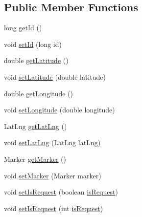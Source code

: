\subsection*{Public Member Functions}
\begin{DoxyCompactItemize}
\item 
long \hyperlink{classuk_1_1ac_1_1swan_1_1digitaltrails_1_1components_1_1_waypoint_a7528e52835d004bed859e863b2902247}{get\+Id} ()
\item 
void \hyperlink{classuk_1_1ac_1_1swan_1_1digitaltrails_1_1components_1_1_waypoint_ad59dbf85147b88698c2e64aff81e71af}{set\+Id} (long id)
\item 
double \hyperlink{classuk_1_1ac_1_1swan_1_1digitaltrails_1_1components_1_1_waypoint_a974b98165eec5b3d35a6e89a9955e5ed}{get\+Latitude} ()
\item 
void \hyperlink{classuk_1_1ac_1_1swan_1_1digitaltrails_1_1components_1_1_waypoint_a6d990b5da843b533358eb3bc46cf8345}{set\+Latitude} (double latitude)
\item 
double \hyperlink{classuk_1_1ac_1_1swan_1_1digitaltrails_1_1components_1_1_waypoint_a5602ecb78e4ac3f6aabbf10791bd063a}{get\+Longitude} ()
\item 
void \hyperlink{classuk_1_1ac_1_1swan_1_1digitaltrails_1_1components_1_1_waypoint_a31ddb3a7285734c9f0a7c003a2a7c6fc}{set\+Longitude} (double longitude)
\item 
Lat\+Lng \hyperlink{classuk_1_1ac_1_1swan_1_1digitaltrails_1_1components_1_1_waypoint_a9b922a309a7f39ff892bf61fc0c38f1d}{get\+Lat\+Lng} ()
\item 
void \hyperlink{classuk_1_1ac_1_1swan_1_1digitaltrails_1_1components_1_1_waypoint_ab825615fd2b9394595467256c6c82e82}{set\+Lat\+Lng} (Lat\+Lng lat\+Lng)
\item 
Marker \hyperlink{classuk_1_1ac_1_1swan_1_1digitaltrails_1_1components_1_1_waypoint_af51889676a52e65d3ec1660de6e555bb}{get\+Marker} ()
\item 
void \hyperlink{classuk_1_1ac_1_1swan_1_1digitaltrails_1_1components_1_1_waypoint_ac42d1a3f0a3f00663e00096911094750}{set\+Marker} (Marker marker)
\item 
void \hyperlink{classuk_1_1ac_1_1swan_1_1digitaltrails_1_1components_1_1_waypoint_af322e2ce2a5428808c335cd8289d0f71}{set\+Is\+Request} (boolean \hyperlink{classuk_1_1ac_1_1swan_1_1digitaltrails_1_1components_1_1_waypoint_a2659a3696f0cf8bc13a2a8661795da50}{is\+Request})
\item 
void \hyperlink{classuk_1_1ac_1_1swan_1_1digitaltrails_1_1components_1_1_waypoint_ab81fca942cf5dd6991854f9fdc96a88c}{set\+Is\+Request} (int \hyperlink{classuk_1_1ac_1_1swan_1_1digitaltrails_1_1components_1_1_waypoint_a2659a3696f0cf8bc13a2a8661795da50}{is\+Request})

\end{DoxyCompactItemize}
